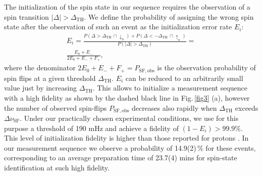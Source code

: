 \documentclass[preprint%
]{elsarticle}
\begin{document}
The initialization of the spin state in our sequence requires the observation of a spin transition $|\Delta| > \Delta_{\mathrm{TH}}$. We define the probability of assigning the wrong spin state after the observation of such an event as the initialization error rate $E_i$:
\begin{eqnarray}
E_{i} = \frac{P(\Delta>\Delta_{\mathrm{TH}}\,\cap\downarrow_n) + P(\Delta<-\Delta_{\mathrm{TH}}\,\cap\uparrow_n)}{P( \left|\Delta\right|>\Delta_{\mathrm{TH}})}  = \nonumber \\
\frac{E_0 + E_-}{2 E_0 + E_- + F_+},
\end{eqnarray}
where the denominator $2 E_0 + E_- + F_+ = P_{\mathrm{SF,obs}}$ is the observation probability of spin flips at a given threshold $\Delta_{\mathrm{TH}}$. $E_i$ can be reduced to an arbitrarily small value just by increasing $\Delta_{\mathrm{TH}}$. This allows to initialize a measurement sequence with a high fidelity as shown by the dashed black line in Fig.$\,$\ref{fig3} (a), however the number of observed spin-flips $P_{\mathrm{SF,obs}}$ decreases also rapidly when $\Delta_{\mathrm{TH}}$ exceeds $\Delta\nu_\mathrm{SF}$. Under our practically chosen experimental conditions, we use for this purpose a threshold of 190 mHz and achieve a fidelity of $(1-E_{i}) > 99.9 \%$. This level of initialization fidelity is higher than those reported for protons \cite{MooserPRL2013,JackPRL2013}. In our measurement sequence we observe a probability of 14.9(2)$\,\%$ for these events, corresponding to an average preparation time of 23.7(4) mins for spin-state identification at such high fidelity.
\end{document}
